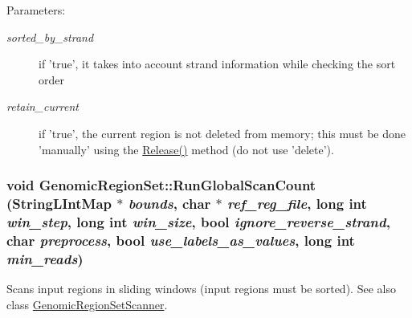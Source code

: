 \begin{Desc}
\item[Parameters:]
\begin{description}
\item[{\em sorted\_\-by\_\-strand}]if 'true', it takes into account strand information while checking the sort order \item[{\em retain\_\-current}]if 'true', the current region is not deleted from memory; this must be done 'manually' using the \hyperlink{classGenomicRegionSet_8993c741ef2513ba5c5b88eb390f1f99}{Release()} method (do not use 'delete'). \end{description}
\end{Desc}
\hypertarget{classGenomicRegionSet_45cac26bedec4d983127b93d2096f735}{
\subsubsection[RunGlobalScanCount]{\setlength{\rightskip}{0pt plus 5cm}void GenomicRegionSet::RunGlobalScanCount (StringLIntMap $\ast$ {\em bounds}, \/  char $\ast$ {\em ref\_\-reg\_\-file}, \/  long int {\em win\_\-step}, \/  long int {\em win\_\-size}, \/  bool {\em ignore\_\-reverse\_\-strand}, \/  char {\em preprocess}, \/  bool {\em use\_\-labels\_\-as\_\-values}, \/  long int {\em min\_\-reads})}}
\label{classGenomicRegionSet_45cac26bedec4d983127b93d2096f735}


Scans input regions in sliding windows (input regions must be sorted). See also class \hyperlink{classGenomicRegionSetScanner}{GenomicRegionSetScanner}. 

